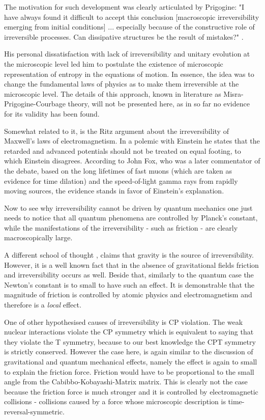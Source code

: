 \documentclass[a4paper,12pt]{article}
\begin{document}
The motivation for such development was clearly articulated by Prigogine:
"I have always found it difficult to accept this conclusion [macroscopic irreversibility emerging from initial conditions] {...} especially because of the constructive role of irreversible processes. Can dissipative structures be the result of mistakes?" \cite{Prigogine:1978kz}.

His personal dissatisfaction with lack of irreversibility and unitary evolution at the microscopic level led him to postulate the existence of microscopic representation of entropy in the equations of motion. 
In essence, the idea was to change the fundamental laws of physics as to make them irreversible at the microscopic level. The details of this approach, known in literature as Misra-Prigogine-Courbage theory\cite{Courbage:1983eo}, will not be presented here, as in so far no evidence for its validity has been found\cite{Bricmont:7zJsfTpK}.

Somewhat related to it, is the Ritz argument about the irreversibility of Maxwell's laws of electromagnetism. In a polemic with Einstein he states that the retarded and advanced potentials should not be treated on equal footing, to which Einstein disagrees. 
According to John Fox, who was a later commentator of the debate, based on the long lifetimes of fast muons (which are taken as evidence for time dilation) and the speed-of-light gamma rays from rapidly moving sources, the evidence stands in favor of Einstein's explanation\cite{Fox:1965bg}.

Now to see why irreversibility cannot be driven by quantum mechanics one just needs to notice that all quantum phenomena are controlled by Planck's constant, while the manifestations of the irreversibility - such as friction - are clearly macroscopically large. %

A different school of thought \cite{KIEFER2005}\cite{Barbour:2014hq}, %
claims that gravity is the source of irreversibility. However, it is a well known fact that in the absence of gravitational fields friction and irreversibility occurs as well. Beside that, similarly to the quantum case the Newton's constant is to small to have such an effect. It is demonstrable that the magnitude of friction is controlled by atomic physics and electromagnetism and therefore is a \textit{local} effect. 

One of other hypothesised causes of irreversibility is CP violation. %
The weak nuclear interactions violate the CP symmetry which is equivalent to saying that they violate the T symmetry, because to our best knowledge the CPT symmetry is strictly conserved. However the case here, is again similar to the discussion of gravitational and quantum mechanical effects, namely the effect is again to small to explain the friction force. Friction would have to be proportional to the small angle from the Cabibbo-Kobayashi-Matrix matrix.
This is clearly not the case because the friction force is much stronger and it is controlled by electromagnetic collisions - collisions caused by a force whose microscopic description is time-reversal-symmetric.
 
\end{document}
